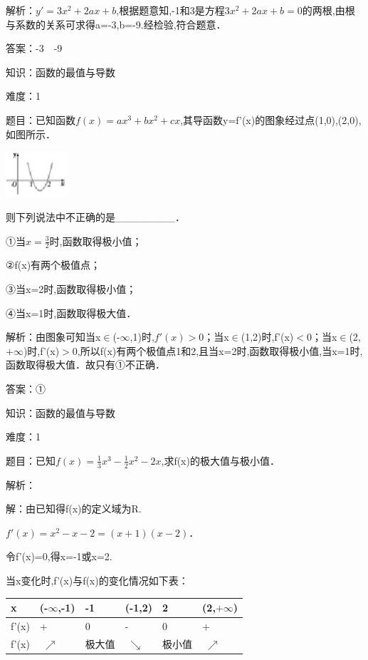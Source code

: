 \documentclass{article} %
\begin{document}
解析：$y'=3x^{2}+2ax+b$,根据题意知,-1和3是方程$3x^{2}+2ax+b=0$的两根,由根与系数的关系可求得a=-3,b=-9.经检验,符合题意．

答案：-3　-9



知识：函数的最值与导数

难度：1

题目：已知函数$f(x)=ax^{3}+bx^{2}+cx$,其导函数y=f'(x)的图象经过点(1,0),(2,0),如图所示．

\includegraphics*[width=0.92in, height=0.67in, keepaspectratio=false]{image53}

则下列说法中不正确的是\_\_\_\_\_\_\_\_．

①当$x=\frac{3}{2}$时,函数取得极小值；

②f(x)有两个极值点；

③当x=2时,函数取得极小值；

④当x=1时,函数取得极大值．

解析：由图象可知当x${\in}$(-$\infty$,1)时,$f'(x)>0$；当x${\in}$(1,2)时,f'(x)${<}$0；当x${\in}$(2,$+\infty$)时,f'(x)${>}$0,所以f(x)有两个极值点1和2,且当x=2时,函数取得极小值,当x=1时,函数取得极大值．故只有①不正确．

答案：①



知识：函数的最值与导数

难度：1

题目：已知$f(x)=\frac{1}{3}x^{3}-\frac{1}{2}x^{2}-2x$,求f(x)的极大值与极小值．

解析：

解：由已知得f(x)的定义域为R.

$f'(x)=x^{2}-x-2=(x+1)(x-2)$．

令f'(x)=0,得x=-1或x=2.

当x变化时,f'(x)与f(x)的变化情况如下表：



\begin{tabular}{|p{0.5in}|p{0.8in}|p{0.5in}|p{0.7in}|p{0.5in}|p{0.8in}|} \hline 
	x & (-$\infty$,-1) & -1 & (-1,2) & 2 & (2,$+\infty$) \\ \hline 
	f'(x) & + & 0 & - & 0 & + \\ \hline 
	f'(x) & ${\nearrow}$ & 极大值 & ${\searrow}$ & 极小值 & ${\nearrow}$ \\ \hline 
\end{tabular}
\end{document}
